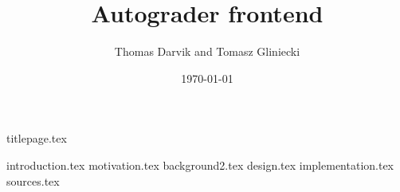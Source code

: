 \documentclass[12pt]{report}
\title{Autograder frontend}
\author{Thomas Darvik and Tomasz Gliniecki}
\date{\today}
\begin{document}
{titlepage.tex}
{}
\tableofcontents
{}

{introduction.tex}
{motivation.tex}
{background2.tex}
{design.tex}
{implementation.tex}
{sources.tex}
\end{document}
